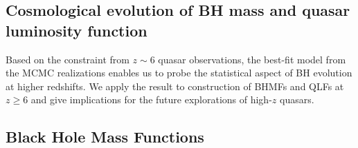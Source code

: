 \documentclass[twocolumn, twocolappendix]{aastex63}
\begin{document}
\begin{CJK*}{UTF8}{gbsn}
\vspace{2mm}
\section{Cosmological evolution of BH mass and quasar luminosity function}\label{sec:cosm}




Based on the constraint from $z\sim 6$ quasar observations, the best-fit model from the MCMC realizations enables
us to probe the statistical aspect of BH evolution at higher redshifts.
We apply the result to construction of BHMFs and QLFs at $z\geq 6$ and give implications for
the future explorations of high-$z$ quasars.


\subsection{Black Hole Mass Functions}



\end{CJK*}
\end{document}
